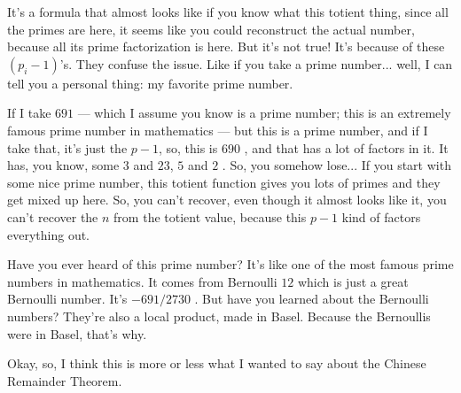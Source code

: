 \begin{speech}[00:20:45 - 00:22:20]
It's a formula that almost looks like if you know what this totient thing, since all the primes are here, it seems like you could reconstruct the actual number, because all its prime factorization is here. But it's not true! It's because of these $(p_i - 1)$'s. They confuse the issue. Like if you take a prime number... well, I can tell you a personal thing: my favorite prime number.

If I take $691$  --- which I assume you know is a prime number; this is an extremely famous prime number in mathematics --- but this is a prime number, and if I take that, it's just the $p - 1$, so, this is $690$ , and that has a lot of factors in it. It has, you know, some $3$ and $23$, $5$ and $2$ . So, you somehow lose... If you start with some nice prime number, this totient function gives you lots of primes and they get mixed up here. So, you can't recover, even though it almost looks like it, you can't recover the $n$ from the totient value, because this $p - 1$ kind of factors everything out.

Have you ever heard of this prime number? It's like one of the most famous prime numbers in mathematics. It comes from Bernoulli $12$  which is just a great Bernoulli number. It's $-691 / 2730$ . But have you learned about the Bernoulli numbers? They're also a local product, made in Basel. Because the Bernoullis were in Basel, that's why.

Okay, so, I think this is more or less what I wanted to say about the Chinese Remainder Theorem.
\end{speech}

